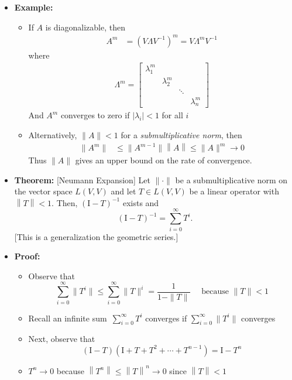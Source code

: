 \documentclass[11pt,twoside]{report}
\newcommand{\Id}{{\mathrm{I}}}
\begin{document}
\begin{itemize}
\item \textbf{Example:}
\begin{itemize}
\item  If $A$ is diagonalizable, then 
\begin{align*}
A^m  & =(V \Lambda V^{-1})^m  =V \Lambda^m  V^{-1}
\end{align*}
where
\begin{align*}
 \Lambda^m  = \begin{bmatrix} \lambda^m_1 & & & \\ & \lambda^m_2 & & \\ & & \ddots & \\ & & & \lambda^m_n \end{bmatrix}
 \end{align*}
 And $A^m$ converges to zero if $|\lambda_i| < 1$ for all $i$
\item Alternatively, $\|A \| <1$ for a \emph{submultiplicative norm}, then
\begin{align*}
\| A^m\|   &  \le \| A^{m-1} \| \left\| A \right\| \le \| A \|^m \to 0  
\end{align*}
Thus $\|A \|$ gives an upper bound on the rate of convergence. 
\end{itemize} 
 

\item \textbf{Theorem:} [Neumann Expansion] Let $\| \cdot \|$ be a submultiplicative norm on the vector space $L(V,V)$ and let $T \in L(V,V)$ be a linear operator with $\left\| T \right\| < 1$.
Then, $(\Id-T)^{-1}$ exists and 
\[ (\Id-T)^{-1} = \sum_{i=0}^{\infty} T^i. \]
[This is a generalization the geometric series.]
\item \textbf{Proof:} 
\begin{itemize}
\item Observe that 
\[
\sum_{i=0}^{\infty} \| T^i \| \leq \sum_{i=0}^{\infty} \| T \|^i = \frac{1}{1-\|T\|} \quad \text{ because $\|T\|<1$}
\]

\item Recall an infinite sum $\,\sum_{i=0}^{\infty} T^i$ converges if $\sum_{i=0}^{\infty} \| T^i \|$ converges 

\item Next, observe that 
\[
(\Id - T) \left( \Id + T + T^2 + \cdots + T^{n-1} \right) = \Id - T^n 
\]

\item $T^n \to 0$ because $ \left\| T^n \right\| \leq \left\| T \right\|^n \rightarrow 0$ since $\left\| T \right\| < 1$ \vspace{1mm}


\end{itemize}
\end{itemize}
\end{document}
